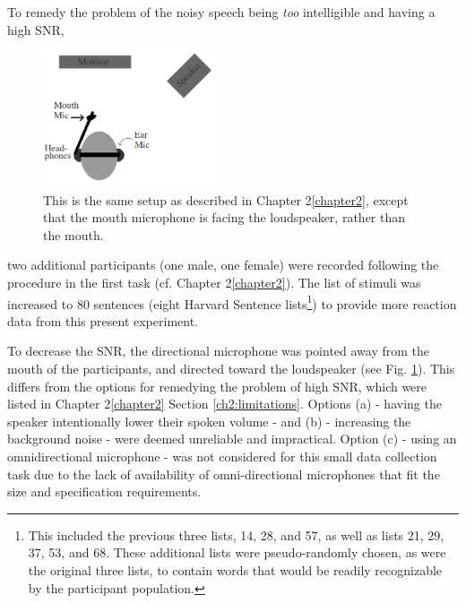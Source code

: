\documentclass[dissertation,copyright]{uathesis}
\begin{document}
To remedy the problem of the noisy speech being \textit{too} intelligible and having a high SNR, 
%
\begin{figure}
\centering
  \includegraphics[width=0.45\textwidth]{figure/overallSetUp_new.png}
  \caption{This is the same setup as described in Chapter 2\ref{chapter2}, except that the mouth microphone is facing the loudspeaker, rather than the mouth.}
  \label{fig:overallSetUp_new}
\end{figure}
%
two additional participants (one male, one female) were recorded following the procedure in the first task (cf. Chapter 2\ref{chapter2}).  The list of stimuli was increased to 80 sentences (eight Harvard Sentence lists\footnote{This included the previous three lists, 14, 28, and 57, as well as lists 21, 29, 37, 53, and 68. These additional lists were pseudo-randomly chosen, as were the original three lists, to contain words that would be readily recognizable by the participant population.}) to provide more reaction data from this present experiment.  

To decrease the SNR, the directional microphone was pointed away from the mouth of the participants, and directed toward the loudspeaker (see Fig. \ref{fig:overallSetUp_new}).  This differs from the options for remedying the problem of high SNR, which were listed in Chapter 2\ref{chapter2} Section \ref{ch2:limitations}.  Options (a) - having the speaker intentionally lower their spoken volume - and (b) - increasing the background noise - were deemed unreliable and impractical.  Option (c) - using an omnidirectional microphone - was not considered for this small data collection task due to the lack of availability of omni-directional microphones that fit the size and specification requirements.
\end{document}
